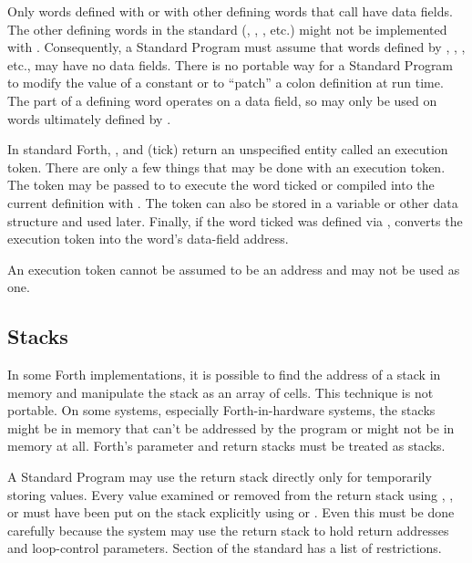 Only words defined with  or with other defining words
that call  have data fields. The other defining words
in the standard (, , \word{:}, etc.)
might not be implemented with . Consequently, a Standard
Program must assume that words defined by ,
, \word{:}, etc., may have no data fields. There is no
portable way for a Standard Program to modify the value of a constant or to
``patch'' a colon definition at run time.
The  part of a defining word operates on a data field,
so  may only be used on words ultimately defined by .

In standard Forth, , \word{[']} and  (tick) return an
unspecified entity called an execution token. There are only a
few things that may be done with an execution token. The token may be
passed to  to execute the word ticked or compiled into
the current definition with . The token can also be
stored in a variable or other data structure and used later.
Finally, if the word ticked was defined via , 
converts the execution token into the word's data-field address.

An execution token cannot be assumed to be an address and may not
be used as one.


\subsection{Stacks} %

In some Forth implementations, it is possible to find the address of
a stack in memory and manipulate the stack as an array of cells. This
technique is not portable. On some systems, especially
Forth-in-hardware systems, the stacks might be in memory
that can't be addressed by the program or might not be in memory at
all. Forth's parameter and return stacks must be treated as stacks.

A Standard Program may use the return stack directly only for
temporarily storing values. Every value examined or removed from the
return stack using , , or  must have been
put on the stack explicitly using  or . Even this
must be done carefully because the system may use the return stack to
hold return addresses and loop-control parameters. Section
 of the standard has a
list of restrictions.



